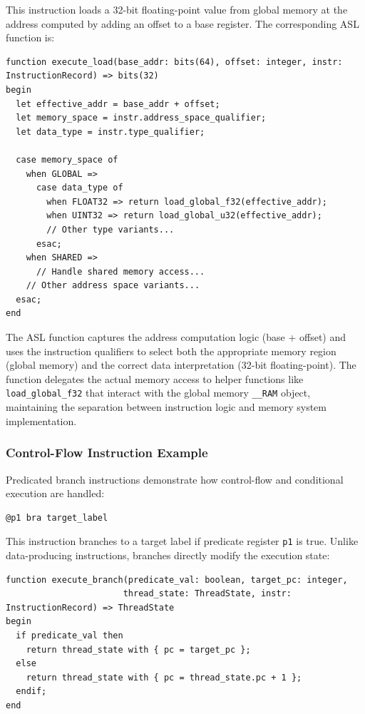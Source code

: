 This instruction loads a 32-bit floating-point value from global memory at the
address computed by adding an offset to a base register. The corresponding ASL
function is:

\begin{lstlisting}[language=ASL]
function execute_load(base_addr: bits(64), offset: integer, instr: InstructionRecord) => bits(32)
begin
  let effective_addr = base_addr + offset;
  let memory_space = instr.address_space_qualifier;
  let data_type = instr.type_qualifier;
  
  case memory_space of
    when GLOBAL => 
      case data_type of
        when FLOAT32 => return load_global_f32(effective_addr);
        when UINT32 => return load_global_u32(effective_addr);
        // Other type variants...
      esac;
    when SHARED => 
      // Handle shared memory access...
    // Other address space variants...
  esac;
end
\end{lstlisting}

The ASL function captures the address computation logic (base + offset) and
uses the instruction qualifiers to select both the appropriate memory region
(global memory) and the correct data interpretation (32-bit floating-point).
The function delegates the actual memory access to helper functions like
\lstinline{load_global_f32} that interact with the global memory
\lstinline{__RAM} object, maintaining the separation between instruction logic
and memory system implementation.

\subsubsection{Control-Flow Instruction Example}

Predicated branch instructions demonstrate how control-flow and conditional
execution are handled:
\begin{lstlisting}
@p1 bra target_label
\end{lstlisting}

This instruction branches to a target label if predicate register
\lstinline{p1} is true. Unlike data-producing instructions, branches directly
modify the execution state:

\begin{lstlisting}[language=ASL]
function execute_branch(predicate_val: boolean, target_pc: integer, 
                       thread_state: ThreadState, instr: InstructionRecord) => ThreadState
begin
  if predicate_val then
    return thread_state with { pc = target_pc };
  else
    return thread_state with { pc = thread_state.pc + 1 };
  endif;
end
\end{lstlisting}


